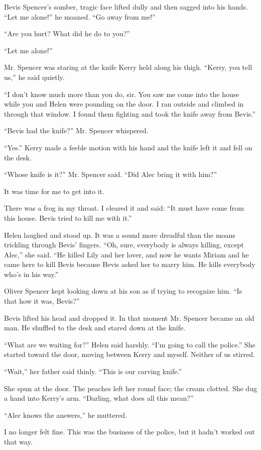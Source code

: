 \documentclass{novel}
\begin{document}
Bevis Spencer’s somber, tragic face lifted dully and then sagged into his hands. “Let me alone!” he moaned. “Go away from me!”

“Are you hurt? What did he do to you?”

“Let me alone!”

Mr. Spencer was staring at the knife Kerry held along his thigh. “Kerry, you tell us,” he said quietly.

“I don’t know much more than you do, sir. You saw me come into the house while you and Helen were pounding on the door. I ran outside and climbed in through that window. I found them fighting and took the knife away from Bevis.”

“Bevis had the knife?” Mr. Spencer whispered.

“Yes.” Kerry made a feeble motion with his hand and the knife left it and fell on the desk.

“Whose knife is it?” Mr. Spencer said. “Did Alec bring it with him?”

It was time for me to get into it.

There was a frog in my throat. I cleared it and said: “It must have come from this house. Bevis tried to kill me with it.”

Helen laughed and stood up. It was a sound more dreadful than the moans trickling through Bevis’ fingers. “Oh, sure, everybody is always killing, except Alec,” she said. “He killed Lily and her lover, and now he wants Miriam and he came here to kill Bevis because Bevis asked her to marry him. He kills everybody who’s in his way.”

Oliver Spencer kept looking down at his son as if trying to recognize him. “Is that how it was, Bevis?”

Bevis lifted his head and dropped it. In that moment Mr. Spencer became an old man. He shuffled to the desk and stared down at the knife.

“What are we waiting for?” Helen said harshly. “I’m going to call the police.” She started toward the door, moving between Kerry and myself. Neither of us stirred.

“Wait,” her father said thinly. “This is our carving knife.”

She spun at the door. The peaches left her round face; the cream clotted. She dug a hand into Kerry’s arm. “Darling, what does all this mean?”

“Alec knows the answers,” he muttered.

I no longer felt fine. This was the business of the police, but it hadn’t worked out that way.
\end{document}
